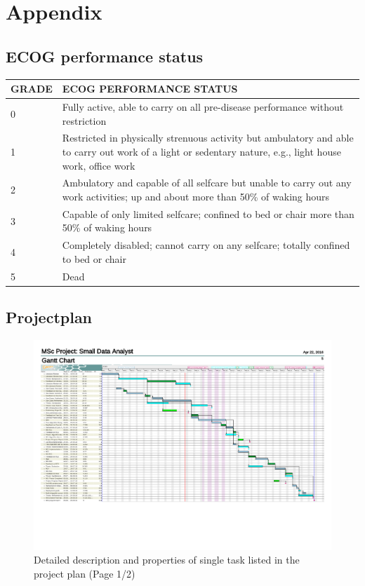 
\section{Appendix}

\subsection{ECOG performance status}


\begin{tabular}{|l p{8cm}|}
\hline
GRADE&	ECOG PERFORMANCE STATUS\\
\hline\hline
0	&Fully active, able to carry on all pre-disease performance without restriction\\
1	&Restricted in physically strenuous activity but ambulatory and able to carry out work of a light or sedentary nature, e.g., light house work, office work\\
2	&Ambulatory and capable of all selfcare but unable to carry out any work activities; up and about more than 50\% of waking hours\\
3	&Capable of only limited selfcare; confined to bed or chair more than 50\% of waking hours\\
4	&Completely disabled; cannot carry on any selfcare; totally confined to bed or chair\\
5	&Dead\\
\hline
\end{tabular}
\label{tab:ecog}


\subsection{Projectplan}
\begin{figure}
	\centering
	\includegraphics[page=2,width=\textwidth]{appendix/Projectplan.pdf}
	\caption{Detailed description and properties of single task listed in the project plan (Page 1/2)}
	\label{fig:projectplan:details:1}
\end{figure}

